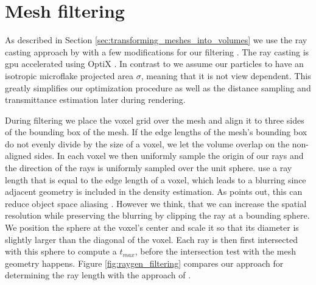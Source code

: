 \section{Mesh filtering}
\label{sec:mesh_filtering}
As described in Section \ref{sec:transforming_meshes_into_volumes} we use the ray casting approach by \citeauthor{hybrid_mesh_volume_lods} with a few modifications for our filtering \cite{hybrid_mesh_volume_lods}.
The ray casting is \ac{gpu} accelerated using OptiX \cite{parker_optix}.
In contrast to \citeauthor{hybrid_mesh_volume_lods} we assume our particles to have an isotropic microflake projected area $\sigma$, meaning that it is not view dependent.
This greatly simplifies our optimization procedure as well as the distance sampling and transmittance estimation later during rendering.

During filtering we place the voxel grid over the mesh and align it to three sides of the bounding box of the mesh.
If the edge lengths of the mesh's bounding box do not evenly divide by the size of a voxel, we let the volume overlap on the non-aligned sides.
In each voxel we then uniformly sample the origin of our rays and the direction of the rays is uniformly sampled over the unit sphere.
\citeauthor{hybrid_mesh_volume_lods} use a ray length that is equal to the edge length of a voxel, which leads to a blurring since adjacent geometry is included in the density estimation.
As \citeauthor{wang_object_space_aliasing} points out, this can reduce object space aliasing \cite{wang_object_space_aliasing}.
However we think, that we can increase the spatial resolution while preserving the blurring by clipping the ray at a bounding sphere.
We position the sphere at the voxel's center and scale it so that its diameter is slightly larger than the diagonal of the voxel.
Each ray is then first intersected with this sphere to compute a $t_{max}$, before the intersection test with the mesh geometry happens.
Figure \ref{fig:raygen_filtering} compares our approach for determining the ray length with the approach of \citeauthor{hybrid_mesh_volume_lods}.
